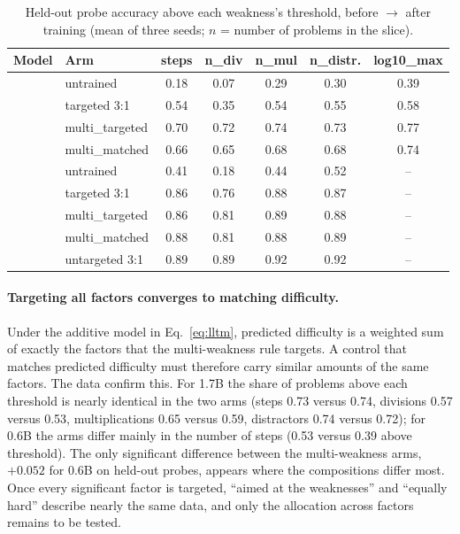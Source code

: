 \documentclass[11pt]{article}
\begin{document}
\begin{table}[t]
\centering
\caption{Held-out probe accuracy above each weakness's threshold, before $\rightarrow$ after training (mean of three
seeds; $n$ = number of problems in the slice).}
\label{tab:slices}
\small
\begin{tabular}{llccccc}
\toprule
Model & Arm & steps & n\_div & n\_mul & n\_distr. & log10\_max \\
\midrule
{}
& untrained        & 0.18 & 0.07 & 0.29 & 0.30 & 0.39 \\
& targeted 3:1     & 0.54 & 0.35 & 0.54 & 0.55 & 0.58 \\
& multi\_targeted  & 0.70 & 0.72 & 0.74 & 0.73 & 0.77 \\
& multi\_matched   & 0.66 & 0.65 & 0.68 & 0.68 & 0.74 \\
\midrule
{}
& untrained        & 0.41 & 0.18 & 0.44 & 0.52 & -- \\
& targeted 3:1     & 0.86 & 0.76 & 0.88 & 0.87 & -- \\
& multi\_targeted  & 0.86 & 0.81 & 0.89 & 0.88 & -- \\
& multi\_matched   & 0.88 & 0.81 & 0.88 & 0.89 & -- \\
& untargeted 3:1   & 0.89 & 0.89 & 0.92 & 0.92 & -- \\
\bottomrule
\end{tabular}
\end{table}

\paragraph{Targeting all factors converges to matching difficulty.}
Under the additive model in Eq.~\eqref{eq:lltm}, predicted difficulty is a weighted sum of exactly the factors that the
multi-weakness rule targets. A control that matches predicted difficulty must therefore carry similar amounts of the same
factors. The data confirm this. For 1.7B the share of problems above each threshold is nearly identical in the two arms
(steps 0.73 versus 0.74, divisions 0.57 versus 0.53, multiplications 0.65 versus 0.59, distractors 0.74 versus 0.72); for
0.6B the arms differ mainly in the number of steps (0.53 versus 0.39 above threshold). The only significant difference
between the multi-weakness arms, $+0.052$ for 0.6B on held-out probes, appears where the compositions differ most. Once
every significant factor is targeted, ``aimed at the weaknesses'' and ``equally hard'' describe nearly the same data,
and only the allocation across factors remains to be tested.
\end{document}
